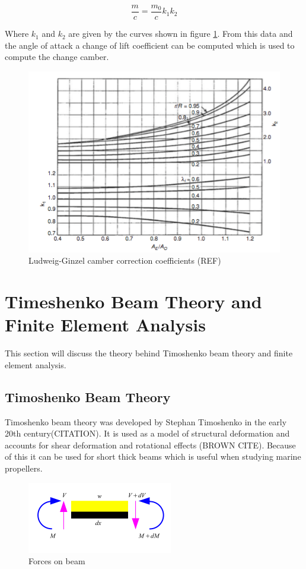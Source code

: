 \documentclass[]{report}
\begin{document}
\begin{equation}
\frac{m}{c} = \frac{m_0}{c} k_1 k_2
\label{eq:m_c}
\end{equation}

Where $k_1$ and $k_2$ are given by the curves shown in figure \ref{fig:curvature_correction_curves}. From this data and the angle of attack a change of lift coefficient can be computed which is used to compute the change camber.
\begin{figure}[h]
	\centering
	\includegraphics[scale=0.5]{curvature_correction_curves}
	\caption{Ludweig-Ginzel camber correction coefficients (REF) }
	\label{fig:curvature_correction_curves}	
\end{figure}
\newpage
 \section{Timeshenko Beam Theory and Finite Element Analysis}
 
 This section will discuss the theory behind Timoshenko beam theory and finite element analysis. 
 \subsection{Timoshenko Beam Theory}
 Timoshenko beam theory was developed by Stephan Timoshenko in the early 20th century(CITATION). It is used as a model of structural deformation and accounts for shear deformation and rotational effects (BROWN CITE). Because of this it can be used for short thick beams which is useful when studying marine propellers.
 
 \begin{figure}
	\centering
	\includegraphics[scale=0.75]{forces_on_beam}
	\caption{Forces on beam}
	\label{fig:forces_on_beam}	
 \end{figure}
 
\end{document}
